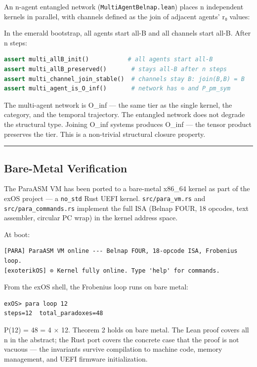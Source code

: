 \documentclass[12pt,a4paper]{article}
\begin{document}
An n-agent entangled network (\texttt{MultiAgentBelnap.lean}) places n independent kernels in parallel, with channels defined as the join of adjacent agents' r₀ values:

In the emerald bootstrap, all agents start all-B and all channels start all-B. After n steps:

\begin{lstlisting}[language=Python]
assert multi_allB_init()           # all agents start all-B
assert multi_allB_preserved()       # stays all-B after n steps
assert multi_channel_join_stable()  # channels stay B: join(B,B) = B
assert multi_agent_is_O_inf()       # network has ⊙ and P_pm_sym
\end{lstlisting}

The multi-agent network is O\_inf --- the same tier as the single kernel, the category, and the temporal trajectory. The entangled network does not degrade the structural type. Joining O\_inf systems produces O\_inf --- the tensor product preserves the tier. This is a non-trivial structural closure property.

\begin{center}
\rule{0.5\textwidth}{0.4pt}
\end{center}

\subsection{Bare-Metal Verification}

The ParaASM VM has been ported to a bare-metal x86\_64 kernel as part of the exOS project --- a \texttt{no\_std} Rust UEFI kernel. \texttt{src/para\_vm.rs} and \texttt{src/para\_commands.rs} implement the full ISA (Belnap FOUR, 18 opcodes, text assembler, circular PC wrap) in the kernel address space.

At boot:

\begin{lstlisting}
[PARA] ParaASM VM online --- Belnap FOUR, 18-opcode ISA, Frobenius loop.
[exoterikOS] ⊙ Kernel fully online. Type 'help' for commands.
\end{lstlisting}

From the exOS shell, the Frobenius loop runs on bare metal:

\begin{lstlisting}
exOS> para loop 12
steps=12  total_paradoxes=48
\end{lstlisting}

P(12) = 48 = 4 $\times$ 12. Theorem 2 holds on bare metal. The Lean proof covers all n in the abstract; the Rust port covers the concrete case that the proof is not vacuous --- the invariants survive compilation to machine code, memory management, and UEFI firmware initialization.
\end{document}
